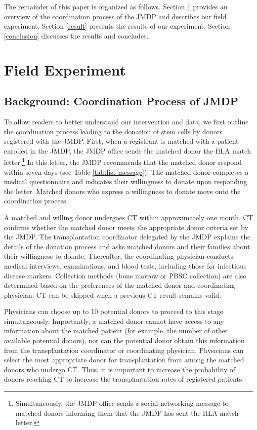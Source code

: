 \documentclass[12pt, a4paper]{article}
\begin{document}
The remainder of this paper is organized as follows. Section \ref{experiment} provides an overview of the coordination process of the JMDP and describes our field experiment. Section \ref{result} presents the results of our experiment. Section \ref{conclusion} discusses the results and concludes.

\hypertarget{experiment}{%
\section{Field Experiment}\label{experiment}}

\hypertarget{background}{%
\subsection{Background: Coordination Process of JMDP}\label{background}}

To allow readers to better understand our intervention and data, we first outline the coordination process leading to the donation of stem cells by donors registered with the JMDP. First, when a registrant is matched with a patient enrolled in the JMDP, the JMDP office sends the matched donor the HLA match letter.\footnote{Simultaneously, the JMDP office sends a social networking message to matched donors informing them that the JMDP has sent the HLA match letter.} In this letter, the JMDP recommends that the matched donor respond within seven days (see Table \ref{tab:list-message}). The matched donor completes a medical questionnaire and indicates their willingness to donate upon responding the letter. Matched donors who express a willingness to donate move onto the coordination process.

A matched and willing donor undergoes CT within approximately one month. CT confirms whether the matched donor meets the appropriate donor criteria set by the JMDP. The transplantation coordinator delegated by the JMDP explains the details of the donation process and asks matched donors and their families about their willingness to donate. Thereafter, the coordinating physician conducts medical interviews, examinations, and blood tests, including those for infectious disease markers. Collection methods (bone marrow or PBSC collection) are also determined based on the preferences of the matched donor and coordinating physician. CT can be skipped when a previous CT result remains valid.

Physicians can choose up to 10 potential donors to proceed to this stage simultaneously. Importantly, a matched donor cannot have access to any information about the matched patient (for example, the number of other available potential donors), nor can the potential donor obtain this information from the transplantation coordinator or coordinating physician. Physicians can select the most appropriate donor for transplantation from among the matched donors who undergo CT. Thus, it is important to increase the probability of donors reaching CT to increase the transplantation rates of registered patients.
\end{document}
